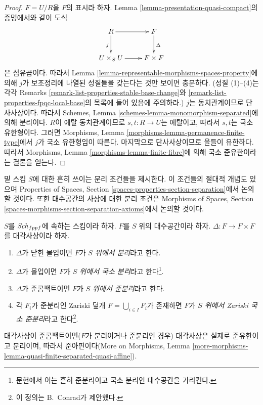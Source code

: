 \begin{proof}
$F = U/R$을 $F$의 표시라 하자.
Lemma \ref{lemma-presentation-quasi-compact}의 증명에서와 같이 도식
$$
\xymatrix{
R \ar[r] \ar[d]_j & F \ar[d]^\Delta \\
U \times_S U \ar[r] & F \times F
}
$$
은 섬유곱이다. 따라서 Lemma
\ref{lemma-representable-morphisms-spaces-property}에 의해
$j$가 보조정리에 나열된 성질들을 갖는다는 것만 보이면 충분하다.
(성질 (1)--(4)는 각각 Remarks
\ref{remark-list-properties-stable-base-change}와
\ref{remark-list-properties-fpqc-local-base}의 목록에 들어 있음에
주의하라.) $j$는 동치관계이므로 단사사상이다. 따라서 Schemes, Lemma
\ref{schemes-lemma-monomorphism-separated}에 의해 분리이다.
$R$이 에탈 동치관계이므로 $s, t : R \to U$는 에탈이고, 따라서
$s, t$는 국소 유한형이다. 그러면 Morphisms, Lemma
\ref{morphisms-lemma-permanence-finite-type}에서 $j$가 국소 유한형임이
따른다. 마지막으로 단사사상이므로 올들이 유한하다. 따라서 Morphisms,
Lemma \ref{morphisms-lemma-finite-fibre}에 의해 국소 준유한이라는
결론을 얻는다.
\end{proof}

\noindent
밑 스킴 $S$에 대한 흔히 쓰이는 분리 조건들을 제시한다.
이 조건들의 절대적 개념도 있으며 Properties of Spaces, Section
\ref{spaces-properties-section-separation}에서 논의할 것이다.
또한 대수공간의 사상에 대한 분리 조건은 Morphisms of Spaces, Section
\ref{spaces-morphisms-section-separation-axioms}에서 논의할 것이다.

\begin{definition}
\label{definition-separated}
$S$를 $\mathit{Sch}_{fppf}$에 속하는 스킴이라 하자.
$F$를 $S$ 위의 대수공간이라 하자.
$\Delta : F \to F \times F$를 대각사상이라 하자.
\begin{enumerate}
\item $\Delta$가 닫힌 몰입이면 $F$가 {\it $S$ 위에서 분리}라고 한다.
\item $\Delta$가 몰입이면 $F$가 {\it $S$ 위에서 국소 분리}라고
한다\footnote{문헌에서 이는 흔히 준분리이고 국소 분리인 대수공간을
가리킨다.}.
\item $\Delta$가 준콤팩트이면 $F$가 {\it $S$ 위에서 준분리}라고 한다.
\item 각 $F_i$가 준분리인 Zariski 덮개
$F = \bigcup_{i \in I} F_i$가 존재하면 $F$가
{\it $S$ 위에서 Zariski 국소 준분리}라고 한다\footnote{이 정의는
B.\ Conrad가 제안했다.}.
\end{enumerate}
\end{definition}

\noindent
대각사상이 준콤팩트이면($F$가 분리이거나 준분리인 경우) 대각사상은
실제로 준유한이고 분리이며, 따라서 준아핀이다(More on Morphisms,
Lemma \ref{more-morphisms-lemma-quasi-finite-separated-quasi-affine}).








